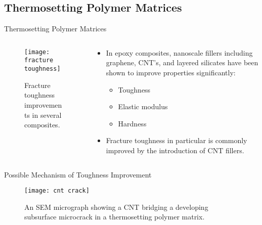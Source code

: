 \documentclass[12pt,letterpaper]{beamer}
\begin{document}
\subsection{Thermosetting Polymer Matrices}

\begin{frame}{Thermosetting Polymer Matrices}



  \begin{columns}[T]
      \begin{column}{.5\textwidth}
    \begin{block}{}
        \begin{figure}
                \texttt{[image: fracture toughness]}
                \caption{Fracture toughness improvements in several composites.}
        \end{figure}
        \end{block}
    \end{column}
    \begin{column}{.5\textwidth}
     \begin{block}{}
\begin{itemize}
\item In epoxy composites, nanoscale fillers including graphene, CNT's, and layered silicates have been shown to improve properties significantly: \cite{blackman2007fracture,Salahuddin20021477,Yasmin20062415}
\begin{itemize}
\item Toughness
\item Elastic modulus
\item Hardness
\end{itemize}
\item Fracture toughness in particular is commonly improved by the introduction of CNT fillers. \cite{Lachman20101093}
\end{itemize} 
    \end{block}
    \end{column}
  \end{columns}
\end{frame}

\begin{frame}{Possible Mechanism of Toughness Improvement}
\begin{figure}[]
  \centering
    \texttt{[image: cnt crack]}
    \caption[Micrograph of a CNT bridging a microcrack in a thermoset]{An SEM micrograph showing a CNT bridging a developing subsurface microcrack in a thermosetting polymer matrix.}
\end{figure}
\end{frame}
\end{document}
